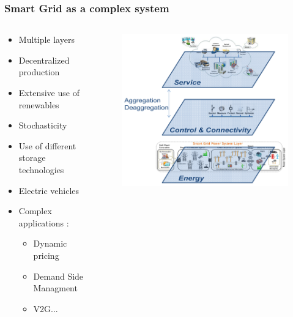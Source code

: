 \documentclass[xcolor=dvipsnames]{beamer}
\begin{document}
\begin{frame}
	\frametitle{Smart Grid as a complex system}
	
	\begin{columns}
		\begin{column}{.5\linewidth}
			\begin{itemize}
				\item Multiple layers
				\item Decentralized production
				\item Extensive use of renewables
				\item Stochasticity
				\item Use of different storage technologies
				\item Electric vehicles
				\item Complex applications :
				\begin{itemize}
					\item Dynamic pricing
					\item Demand Side Managment
					\item V2G...
				\end{itemize}
			\end{itemize}		
		\end{column}
		\begin{column}{.5\linewidth}		
			\begin{figure}
				\includegraphics[scale=2]{smart_grid_3}
			\end{figure}
		\end{column}
	\end{columns}
\end{frame}
\end{document}
